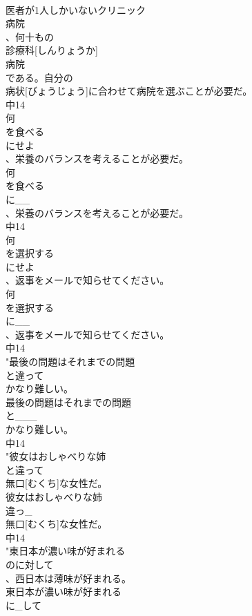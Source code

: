 \documentclass[8pt]{extreport}
\begin{document}
\begin{CJK}{UTF8}{min}
\\	医者が1人しかいないクリニック
\\	病院
\\	、何十もの
\\	診療科[しんりょうか]
\\	病院
\\	である。自分の
\\	病状[びょうじょう]に合わせて病院を選ぶことが必要だ。
\\	中14
\\	何
\\	を食べる
\\	にせよ
\\	、栄養のバランスを考えることが必要だ。
\\	何
\\	を食べる
\\	に__
\\	、栄養のバランスを考えることが必要だ。
\\	中14
\\	何
\\	を選択する
\\	にせよ
\\	、返事をメールで知らせてください。
\\	何
\\	を選択する
\\	に__
\\	、返事をメールで知らせてください。
\\	中14
\\	"最後の問題はそれまでの問題
\\	と違って
\\	かなり難しい。
\\	最後の問題はそれまでの問題
\\	と___
\\	かなり難しい。
\\	中14
\\	"彼女はおしゃべりな姉
\\	と違って
\\	無口[むくち]な女性だ。
\\	彼女はおしゃべりな姉
\\	違っ_
\\	無口[むくち]な女性だ。
\\	中14
\\	"東日本が濃い味が好まれる
\\	のに対して
\\	、西日本は薄味が好まれる。
\\	東日本が濃い味が好まれる
\\	に_して

\end{CJK}
\end{document}
